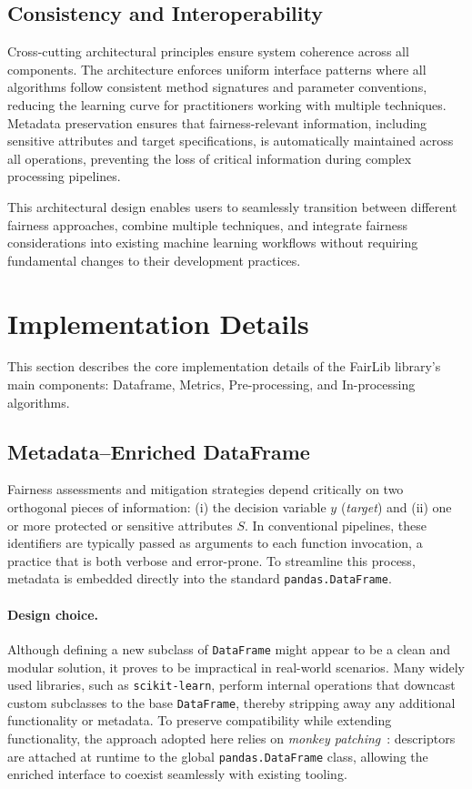 \documentclass[12pt,a4paper,openright,twoside]{book}
\begin{document}
\subsection{Consistency and Interoperability}

Cross-cutting architectural principles ensure system coherence across all components. The architecture enforces uniform interface patterns where all algorithms follow consistent method signatures and parameter conventions, reducing the learning curve for practitioners working with multiple techniques. Metadata preservation ensures that fairness-relevant information, including sensitive attributes and target specifications, is automatically maintained across all operations, preventing the loss of critical information during complex processing pipelines.

This architectural design enables users to seamlessly transition between different fairness approaches, combine multiple techniques, and integrate fairness considerations into existing machine learning workflows without requiring fundamental changes to their development practices.

\section{Implementation Details}
This section describes the core implementation details of the FairLib library's main components: Dataframe, Metrics, Pre-processing, and In-processing algorithms.

\subsection{Metadata--Enriched DataFrame}

Fairness assessments and mitigation strategies depend critically on two orthogonal pieces of information: (i) the decision variable $y$ (\emph{target}) and (ii) one or more protected or sensitive attributes $S$. In conventional pipelines, these identifiers are typically passed as arguments to each function invocation, a practice that is both verbose and error-prone. To streamline this process, metadata is embedded directly into the standard \texttt{pandas.DataFrame}.

\paragraph{Design choice.} Although defining a new subclass of \texttt{DataFrame} might appear to be a clean and modular solution, it proves to be impractical in real-world scenarios. Many widely used libraries, such as \texttt{scikit-learn}, perform internal operations that downcast custom subclasses to the base \texttt{DataFrame}, thereby stripping away any additional functionality or metadata. To preserve compatibility while extending functionality, the approach adopted here relies on \emph{monkey patching}~\cite{carattino2019monkey}: descriptors are attached at runtime to the global \texttt{pandas.DataFrame} class, allowing the enriched interface to coexist seamlessly with existing tooling.
\end{document}
